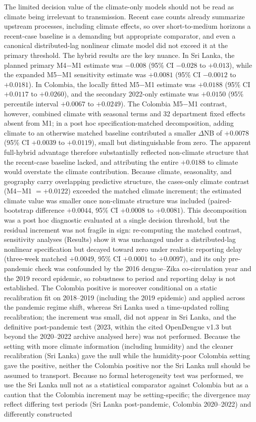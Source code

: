\documentclass[11pt,a4paper]{article}
\begin{document}
The limited decision value of the climate-only models should not be read as climate being irrelevant to transmission. Recent case counts already summarize upstream processes, including climate effects, so over short-to-medium horizons a recent-case baseline is a demanding but appropriate comparator, and even a canonical distributed-lag nonlinear climate model did not exceed it at the primary threshold. The hybrid results are the key nuance. In Sri Lanka, the planned primary M4$-$M1 estimate was $-0.008$ (95\% CI $-0.028$ to $+0.013$), while the expanded M5$-$M1 sensitivity estimate was $+0.0081$ (95\% CI $-0.0012$ to $+0.0181$). In Colombia, the locally fitted M5$-$M1 estimate was $+0.0188$ (95\% CI $+0.0117$ to $+0.0260$), and the secondary 2022-only estimate was $+0.0150$ (95\% percentile interval $+0.0067$ to $+0.0249$). The Colombia M5$-$M1 contrast, however, combined climate with seasonal terms and 32 department fixed effects absent from M1; in a post hoc specification-matched decomposition, adding climate to an otherwise matched baseline contributed a smaller $\Delta$NB of $+0.0078$ (95\% CI $+0.0039$ to $+0.0119$), small but distinguishable from zero. The apparent full-hybrid advantage therefore substantially reflected non-climate structure that the recent-case baseline lacked, and attributing the entire $+0.0188$ to climate would overstate the climate contribution. Because climate, seasonality, and geography carry overlapping predictive structure, the cases-only climate contrast (M4$-$M1 $=+0.0122$) exceeded the matched climate increment; the estimated climate value was smaller once non-climate structure was included (paired-bootstrap difference $+0.0044$, 95\% CI $+0.0008$ to $+0.0081$). This decomposition was a post hoc diagnostic evaluated at a single decision threshold, but the residual increment was not fragile in sign: re-computing the matched contrast, sensitivity analyses (Results) show it was unchanged under a distributed-lag nonlinear specification but decayed toward zero under realistic reporting delay (three-week matched $+0.0049$, 95\% CI $+0.0001$ to $+0.0097$), and its only pre-pandemic check was confounded by the 2016 dengue--Zika co-circulation year and the 2019 record epidemic, so robustness to period and reporting delay is not established. The Colombia positive is moreover conditional on a static recalibration fit on 2018--2019 (including the 2019 epidemic) and applied across the pandemic regime shift, whereas Sri Lanka used a time-updated rolling recalibration; the increment was small, did not appear in Sri Lanka, and the definitive post-pandemic test (2023, within the cited OpenDengue v1.3 but beyond the 2020--2022 archive analysed here) was not performed. Because the setting with more climate information (including humidity) and the cleaner recalibration (Sri Lanka) gave the null while the humidity-poor Colombia setting gave the positive, neither the Colombia positive nor the Sri Lanka null should be assumed to transport. Because no formal heterogeneity test was performed, we use the Sri Lanka null not as a statistical comparator against Colombia but as a caution that the Colombia increment may be setting-specific; the divergence may reflect differing test periods (Sri Lanka post-pandemic, Colombia 2020--2022) and differently constructed 
\end{document}
